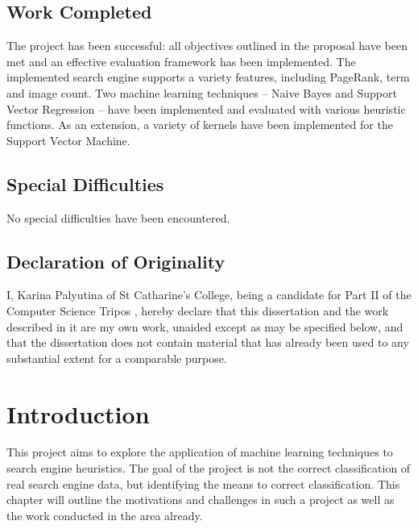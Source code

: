 \documentclass[12pt,a4paper,notitlepage,twoside]{scrbook}
\begin{document}
\section*{Work Completed}
The project has been successful: all objectives outlined in the proposal have been met and
an effective evaluation framework has been implemented. The implemented search engine
supports a variety features, including PageRank, term and image count. Two machine learning techniques --
Naive Bayes and Support Vector Regression -- have been implemented and evaluated with
various heuristic functions. As an extension, a variety of kernels have been implemented
for the Support Vector Machine.

\section*{Special Difficulties}
No special difficulties have been encountered.

\pagebreak
\section*{Declaration of Originality}

I, Karina Palyutina of St Catharine's College, being a candidate for Part II of the Computer
Science Tripos , hereby declare
that this dissertation and the work described in it are my own work,
unaided except as may be specified below, and that the dissertation
does not contain material that has already been used to any substantial
extent for a comparable purpose.

\bigskip
{}

\medskip
{}


\tableofcontents




\setcounter{page}{1}
\pagestyle{fancy}
\chapter{Introduction}
This project aims to explore the application of machine learning techniques to search
engine heuristics. The goal of the project is not the correct classification of real
search engine data, but identifying the means to correct classification. This chapter will
outline the motivations and challenges in such a project as well as the work conducted in
the area already.
\end{document}
